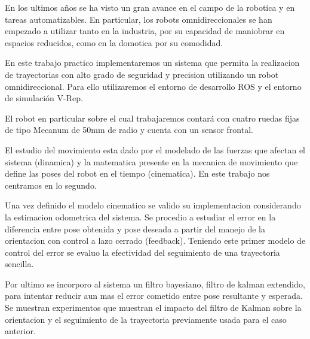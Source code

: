 En los ultimos años se ha visto un gran avance en el campo de la robotica y en tareas automatizables. En particular, los robots omnidireccionales se han empezado a utilizar tanto en la industria, por su capacidad de maniobrar en espacios reducidos, como en la domotica por su comodidad.

En este trabajo practico implementaremos un sistema que permita la realizacion de trayectorias con alto grado de seguridad y precision utilizando un robot omnidireccional. Para ello utilizaremos el entorno de desarrollo ROS y el entorno de simulación V-Rep.

El robot en particular sobre el cual trabajaremos contará con cuatro ruedas fijas de tipo Mecanum de 50mm de radio y cuenta con un sensor frontal. 

El estudio del movimiento esta dado por el modelado de las fuerzas que afectan el sistema (dinamica) y la matematica presente en la mecanica de movimiento que define las poses del robot en el tiempo (cinematica). En este trabajo nos centramos en lo segundo.

Una vez definido el modelo cinematico se valido su implementacion considerando la estimacion odometrica del sistema. Se procedio a estudiar el error en la diferencia entre pose obtenida y pose deseada a partir del manejo de la orientacion con control a lazo cerrado (feedback). Teniendo este primer modelo de control del error se evaluo la efectividad del seguimiento de una trayectoria sencilla.

Por ultimo se incorporo al sistema un filtro bayesiano, filtro de kalman extendido, para intentar reducir aun mas el error cometido entre pose resultante y esperada. Se muestran experimentos que muestran el impacto del filtro de Kalman sobre la orientacion y el seguimiento de la trayectoria previamente usada para el caso anterior.   


